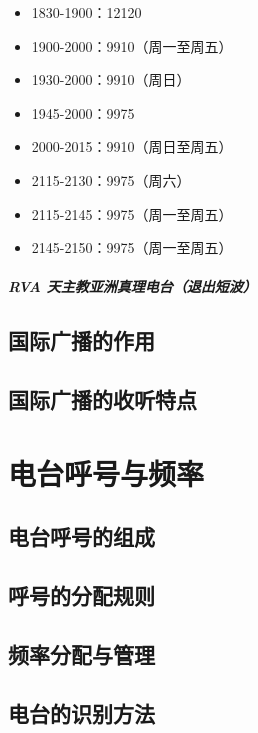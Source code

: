 \documentclass[12pt,UTF8]{ctexbook}
\begin{document}
\begin{itemize}[leftmargin=2cm]
    \item 1830-1900：12120
    \item 1900-2000：9910（周一至周五）
    \item 1930-2000：9910（周日）
    \item 1945-2000：9975
    \item 2000-2015：9910（周日至周五）
    \item 2115-2130：9975（周六）
    \item 2115-2145：9975（周一至周五）
    \item 2145-2150：9975（周一至周五）
\end{itemize}

\paragraph{RVA 天主教亚洲真理电台（退出短波）}

\section{国际广播的作用}

\section{国际广播的收听特点}

\chapter{电台呼号与频率}

\section{电台呼号的组成}

\section{呼号的分配规则}

\section{频率分配与管理}

\section{电台的识别方法}
\end{document}
